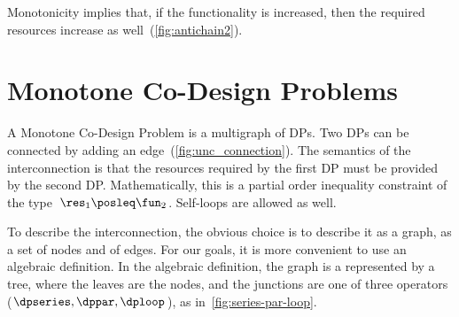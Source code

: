 \noindent Monotonicity implies that, if the functionality is increased,
then the required resources increase as well~(\cref{fig:antichain2}).



\section{Monotone Co-Design Problems }

A Monotone Co-Design Problem is a multigraph of DPs. Two DPs can be
connected by adding an edge~(\cref{fig:unc_connection}). The semantics
of the interconnection is that the resources required by the first
DP must be provided by the second DP. Mathematically, this is a partial
order inequality constraint of the type~$\res_{1}\posleq\fun_{2}$.
Self-loops are allowed as well.

%

To describe the interconnection, the obvious choice is to describe
it as a graph, as a set of nodes and of edges. For our goals, it is
more convenient to use an algebraic definition. In the algebraic definition,
the graph is a represented by a tree, where the leaves are the nodes,
and the junctions are one of three operators ($\dpseries,\dppar,\dploop$),
as in~\cref{fig:series-par-loop}.

